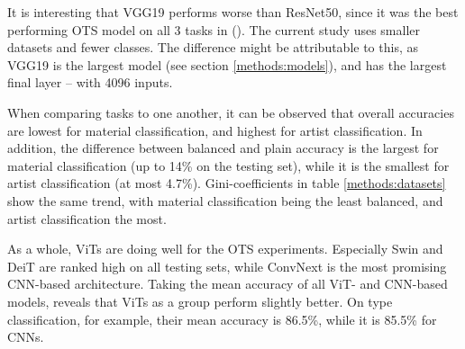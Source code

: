 It is interesting that VGG19 performs worse than ResNet50, since it was the best performing OTS model on all 3 tasks in \citeauthor{sabatelli2018deep} (\citeyear{sabatelli2018deep}). The current study uses smaller datasets and fewer classes. The difference might be attributable to this, as VGG19 is the largest model (see section \ref{methods:models}), and has the largest final layer -- with 4096 inputs.

When comparing tasks to one another, it can be observed that overall accuracies are lowest for material classification, and highest for artist classification. In addition, the difference between balanced and plain accuracy is the largest for material classification (up to 14\% on the testing set), while it is the smallest for artist classification (at most 4.7\%). Gini-coefficients in table \ref{methods:datasets} show the same trend, with material classification being the least balanced, and artist classification the most.

As a whole, ViTs are doing well for the OTS experiments. Especially Swin and DeiT are ranked high on all testing sets, while ConvNext is the most promising CNN-based architecture. Taking the mean accuracy of all ViT- and CNN-based models, reveals that ViTs as a group perform slightly better. On type classification, for example, their mean accuracy is 86.5\%, while it is 85.5\% for CNNs.




